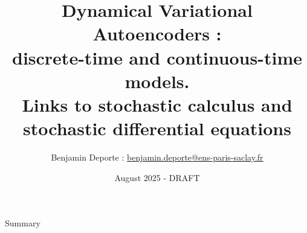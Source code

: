 \documentclass[8pt, aspectratio=169]{beamer}
\title{Dynamical Variational Autoencoders :\\ discrete-time and continuous-time models.\\ Links to stochastic calculus and stochastic differential equations}
\author{
Benjamin Deporte : \href{mailto:benjamin.deporte@ens-paris-saclay.fr}{benjamin.deporte@ens-paris-saclay.fr}%
}
\date{August 2025 - DRAFT}
\begin{document}
\maketitle

\begin{frame}{Summary}
    \tableofcontents
\end{frame}












\printglossary
\end{document}
